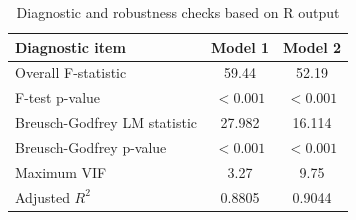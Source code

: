 \begin{table}[H]
\centering
\caption{Diagnostic and robustness checks based on R output}
\label{tab:diagnostics}
\begin{tabular}{lcc}
\toprule
Diagnostic item & Model 1 & Model 2 \\
\midrule
Overall F-statistic & 59.44 & 52.19 \\
F-test p-value & $<0.001$ & $<0.001$ \\
Breusch-Godfrey LM statistic & 27.982 & 16.114 \\
Breusch-Godfrey p-value & $<0.001$ & $<0.001$ \\
Maximum VIF & 3.27 & 9.75 \\
Adjusted $R^2$ & 0.8805 & 0.9044 \\
\bottomrule
\end{tabular}
\end{table}
